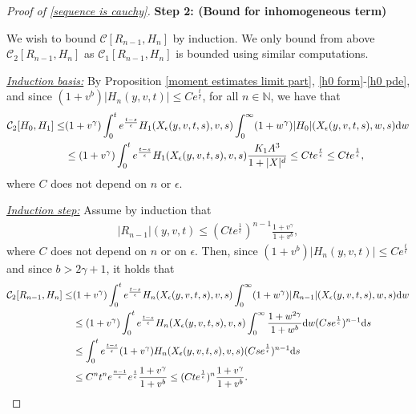 \documentclass[11pt]{article}
\numberwithin{equation}{section}
\newcommand{\der}{\textup{d}}
\begin{document}
\begin{proof}[Proof of \eqref{sequence is cauchy}]
{\bf Step 2: (Bound for inhomogeneous term)}

We wish to bound $\mathcal{C}[R_{n-1},H_{n}]$ by induction. We only  bound from above $\mathcal{C}_{2}[R_{n-1},H_{n}]$ as $\mathcal{C}_{1}[R_{n-1},H_{n}]$ is bounded using similar computations. 
\vspace{0.1cm}

\textit{\underline{Induction basis:}} By Proposition \ref{moment estimates limit part},  \eqref{h0 form}-\eqref{h0 pde}, and since  $(1+v^{b})|H_{n}(y,v,t)|\leq Ce^{\frac{t}{\epsilon}}$, for all $n\in\mathbb{N}$, we have that
\begin{align*}
\mathcal{C}_{2}[H_{0},H_{1}]\leq &(1+v^{\gamma})\int_{0}^{t}e^{\frac{t-s}{\epsilon}}H_{1}(X_{\epsilon}(y,v,t,s),v,s)\int_{0}^{\infty}(1+w^{\gamma}) |H_{0}|(X_{\epsilon}(y,v,t,s),w,s)\der w\\
&\leq  (1+v^{\gamma})\int_{0}^{t} e^{\frac{t-s}{\epsilon}}H_{1}(X_{\epsilon}(y,v,t,s),v,s)\frac{K_{1}A^{3}}{1+|X|^{d}}\leq C t e^{\frac{t}{\epsilon}}\leq C t e^{\frac{1}{\epsilon}},
\end{align*}
where $C$ does not depend on $n$ or $\epsilon$.

\vspace{0.1cm}

\textit{\underline{Induction step:}} Assume by induction that 
\begin{align*}
|R_{n-1}|(y,v,t)\leq (Cte^{\frac{1}{\epsilon}})^{n-1}\frac{1+v^{\gamma}}{1+v^{b}},
\end{align*}
 where $C$ does not depend on $n$ or on $\epsilon$. Then, since $(1+v^{b})|H_{n}(y,v,t)|\leq Ce^{\frac{t}{\epsilon}}$ and since $b>2\gamma+1$, it holds that
\begin{align}\label{same estimates iteration}
\mathcal{C}_{2}[R_{n-1},H_{n}]\leq &(1+v^{\gamma})\int_{0}^{t}e^{\frac{t-s}{\epsilon}}H_{n}(X_{\epsilon}(y,v,t,s),v,s)\int_{0}^{\infty}(1+w^{\gamma}) |R_{n-1}|(X_{\epsilon}(y,v,t,s),w,s)\der w\nonumber\\
&\leq (1+v^{\gamma})\int_{0}^{t}e^{\frac{t-s}{\epsilon}}H_{n}(X_{\epsilon}(y,v,t,s),v,s)\int_{0}^{\infty}\frac{1+w^{2\gamma}}{1+w^{b}} \der w(Cse^{\frac{1}{\epsilon}})^{n-1}\der s\nonumber\\
&\leq  \int_{0}^{t}e^{\frac{t-s}{\epsilon}}(1+v^{\gamma})H_{n}(X_{\epsilon}(y,v,t,s),v,s)(Cse^{\frac{1}{\epsilon}})^{n-1}\der s\nonumber \\
&\leq C^{n} t^{n}e^{\frac{n-1}{\epsilon}} e^{\frac{t}{\epsilon}}\frac{1+v^{\gamma}}{1+v^{b}}\leq (Cte^{\frac{1}{\epsilon}})^{n}\frac{1+v^{\gamma}}{1+v^{b}}.
\end{align}


\end{proof}
\end{document}
